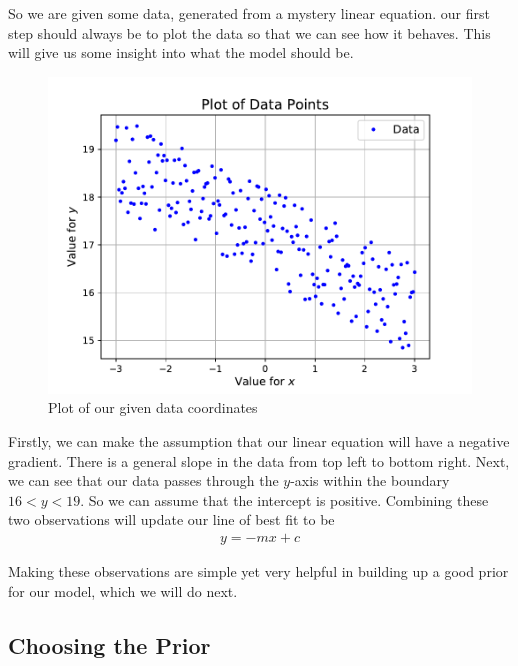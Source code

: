 \documentclass[12pt,twoside]{report}   %
\begin{document}
So we are given some data, generated from a mystery linear equation. our first step should always be to plot the data so that we can see how it behaves. This will give us some insight into what the model should be.
\begin{figure}[H]
\centering
\includegraphics[width = 5in]{Data.pdf}
\caption{Plot of our given data coordinates}
\label{figLinearData}
\end{figure}

Firstly, we can make the assumption that our linear equation will have a negative gradient. There is a general slope in the data from top left to bottom right. Next, we can see  that our data passes through the $y$-axis within the boundary $16<y<19$. So we can assume that the intercept is positive. Combining these two observations will update our line of best fit to be
\begin{align*}
y = -mx + c
\end{align*}

Making these observations are simple yet very helpful in building up a good prior for our model, which we will do next.

\subsection{Choosing the Prior}\label{Choosing the Prior2}
\end{document}
